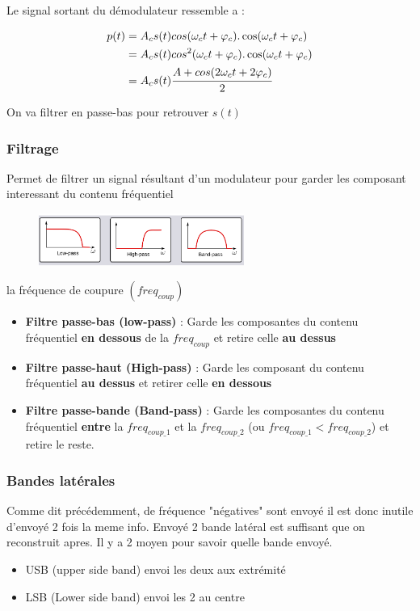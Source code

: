 			
		Le signal sortant du démodulateur ressemble a :
		
		\begin{equation} \label{eq1}
			\begin{split}
				p(t) &= A_c s(t) cos (\omega_c t + \varphi_c).\cos(\omega_c t + \varphi_c)\\
				&= A_c s(t) cos^2 (\omega_c t + \varphi_c).\cos(\omega_c t + \varphi_c)\\
				&= A_c s(t) \cfrac{A + cos(2\omega_c t + 2\varphi_c)}{2}
			\end{split}
		\end{equation}
		
		On va filtrer en passe-bas pour retrouver $s(t)$
		
		\subsubsection{Filtrage}
			Permet de filtrer un signal résultant d'un modulateur pour garder les composant interessant du contenu fréquentiel
			
			\begin{figure}[htp]
			\centering
			\includegraphics[width=0.6\textwidth]{img/filtrage.png}
			\end{figure}
			
			la fréquence de coupure $(freq_{coup})$
			
			\begin{itemize}
				\item \textbf{Filtre passe-bas (low-pass)} : Garde les composantes du contenu fréquentiel \textbf{en dessous} de la $freq_{coup}$ et retire celle \textbf{au dessus}
				\item \textbf{Filtre passe-haut (High-pass)} : Garde les composant du contenu fréquentiel \textbf{au dessus} et retirer celle \textbf{en dessous}
				\item \textbf{Filtre passe-bande (Band-pass)} : Garde les composantes du contenu fréquentiel \textbf{entre} la $freq_{coup\_1}$ et la $freq_{coup\_2}$ (ou $freq_{coup\_1} < freq_{coup\_2}$) et retire le reste.
			\end{itemize}
		
		\subsubsection{Bandes latérales}
			Comme dit précédemment, de fréquence "négatives" sont envoyé il est donc inutile d'envoyé 2 fois la meme info. Envoyé 2 bande latéral est suffisant que on reconstruit apres. Il y a 2 moyen pour savoir quelle bande envoyé.
			\begin{itemize}
				\item USB (upper side band) envoi les deux aux extrémité
				\item LSB (Lower side band) envoi les 2 au centre
			\end{itemize}
			
